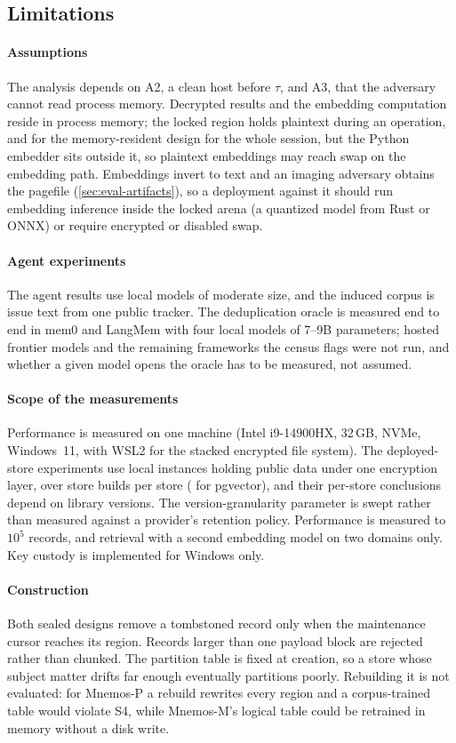\subsection{Limitations}

\paragraph{Assumptions}
The analysis depends on A2, a clean host before $\tau$, and A3, that the adversary cannot read
process memory. Decrypted results and the embedding computation reside in process memory; the locked
region holds plaintext during an operation, and for the memory-resident design for the whole
session, but the Python embedder sits outside it, so plaintext embeddings may reach swap on the
embedding path. Embeddings invert to text and an imaging adversary obtains the pagefile
(\cref{sec:eval-artifacts}), so a deployment against it should run embedding inference inside the
locked arena (a quantized model from Rust or ONNX) or require encrypted or disabled swap.

\paragraph{Agent experiments}
The agent results use local models of moderate size, and the induced corpus is issue text from one
public tracker. The deduplication oracle is measured end to end in mem0 and LangMem with four
local models of 7--9B parameters; hosted frontier models and the remaining frameworks the census
flags were not run, and whether a given model opens the oracle has to be measured, not assumed.

\paragraph{Scope of the measurements}
Performance is measured on one machine (Intel i9-14900HX, 32\,GB, NVMe, Windows~11, with WSL2 for
the stacked encrypted file system). The deployed-store experiments use local instances holding public
data under one encryption layer, over \REsixSeeds{} store builds per store (\REsixteenPgSeeds{} for
pgvector), and their per-store conclusions
depend on library versions. The version-granularity parameter is swept rather than measured against
a provider's retention policy. Performance is measured to $10^5$ records, and retrieval with a second
embedding model on two domains only. Key custody is implemented for Windows only.

\paragraph{Construction}
Both sealed designs remove a tombstoned record only when the maintenance cursor reaches its region.
Records larger than one payload block are rejected rather than chunked. The partition table is fixed
at creation, so a store whose subject matter drifts far enough eventually partitions poorly. Rebuilding
it is not evaluated: for Mnemos-P a rebuild rewrites every region and a corpus-trained table would
violate S4, while Mnemos-M's logical table could be retrained in memory without a disk write.

